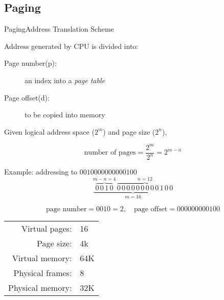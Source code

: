 
\subsection{Paging}

\begin{frame}{Paging}{Address Translation Scheme}
  \begin{iblock}{Address generated by CPU is divided into:}
    \begin{description}
    \item[Page number(p):] an index into a \emph{page table}
    \item[Page offset(d):] to be copied into memory
    \end{description}
  \end{iblock}
  Given \alert{logical address space} ($2^m$) and \alert{page size} ($2^n$),
  \begin{small}
    $$\text{number of pages}=\frac{2^m}{2^n}=2^{m-n}$$
  \end{small}
  \begin{iblock}{Example: addressing to $0010000000000100$}
    $$\underbrace{\overbrace{0\,0\,1\,0}^{m-n=4}\,\overbrace{0\,0\,0\,0\,0\,0\,0\,0\,0\,1\,0\,0}^{n=12}}_{m=16}$$
    \begin{small}
      $$\text{page number}=0010=2, \quad \text{page offset}=000000000100$$
    \end{small}
  \end{iblock}
\end{frame}

\begin{frame}
  \begin{minipage}{.55\textwidth}
    \centering {}%
    \label{fig:paging}
  \end{minipage}\hfill
  \begin{minipage}{.35\textwidth}
    \begin{tabular}{rl}
      Virtual pages:  &16\\
      Page size:      &4k\\
      Virtual memory:& 64K\\
      Physical frames:&8\\
      Physical memory:&32K
    \end{tabular}
  \end{minipage}
\end{frame}

